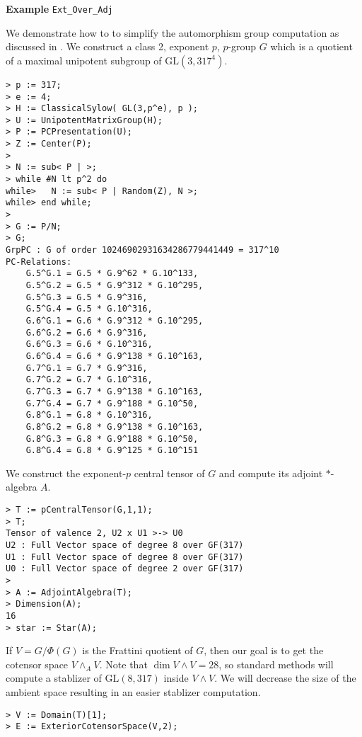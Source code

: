 \begin{framed} {\bf Example} {\tt Ext\_Over\_Adj}\\
{\small We demonstrate how to to simplify the automorphism group computation as discussed in \cite{BW:grps-tensor}.
We construct a class 2, exponent $p$, $p$-group $G$ which is a quotient of a maximal unipotent subgroup of $\text{GL}(3,317^4)$.
\begin{lstlisting}[frame=single,basicstyle=\ttfamily\color{black!30!
teal},backgroundcolor=\color{white!70!gray}]
> p := 317;
> e := 4;
> H := ClassicalSylow( GL(3,p^e), p );
> U := UnipotentMatrixGroup(H);
> P := PCPresentation(U);
> Z := Center(P);
> 
> N := sub< P | >;
> while #N lt p^2 do
while>   N := sub< P | Random(Z), N >;
while> end while;
> 
> G := P/N;
> G;
GrpPC : G of order 10246902931634286779441449 = 317^10
PC-Relations:
    G.5^G.1 = G.5 * G.9^62 * G.10^133, 
    G.5^G.2 = G.5 * G.9^312 * G.10^295, 
    G.5^G.3 = G.5 * G.9^316, 
    G.5^G.4 = G.5 * G.10^316, 
    G.6^G.1 = G.6 * G.9^312 * G.10^295, 
    G.6^G.2 = G.6 * G.9^316, 
    G.6^G.3 = G.6 * G.10^316, 
    G.6^G.4 = G.6 * G.9^138 * G.10^163, 
    G.7^G.1 = G.7 * G.9^316, 
    G.7^G.2 = G.7 * G.10^316, 
    G.7^G.3 = G.7 * G.9^138 * G.10^163, 
    G.7^G.4 = G.7 * G.9^188 * G.10^50, 
    G.8^G.1 = G.8 * G.10^316, 
    G.8^G.2 = G.8 * G.9^138 * G.10^163, 
    G.8^G.3 = G.8 * G.9^188 * G.10^50, 
    G.8^G.4 = G.8 * G.9^125 * G.10^151
\end{lstlisting}
We construct the exponent-$p$ central tensor of $G$ and compute its adjoint $*$-algebra $A$.
\begin{lstlisting}[frame=single,basicstyle=\ttfamily\color{black!30!
teal},backgroundcolor=\color{white!70!gray}]
> T := pCentralTensor(G,1,1);
> T;
Tensor of valence 2, U2 x U1 >-> U0
U2 : Full Vector space of degree 8 over GF(317)
U1 : Full Vector space of degree 8 over GF(317)
U0 : Full Vector space of degree 2 over GF(317)
> 
> A := AdjointAlgebra(T);
> Dimension(A);
16
> star := Star(A);
\end{lstlisting}
If $V=G/\Phi(G)$ is the Frattini quotient of $G$, then our goal is to get the cotensor space $V\wedge_A V$.
Note that $\dim V\wedge V=28$, so standard methods will compute a stablizer of $\text{GL}(8,317)$ inside $V\wedge V$.
We will decrease the size of the ambient space resulting in an easier stablizer computation.
\begin{lstlisting}[frame=single,basicstyle=\ttfamily\color{black!30!
teal},backgroundcolor=\color{white!70!gray}]
> V := Domain(T)[1];
> E := ExteriorCotensorSpace(V,2);

\end{lstlisting}}
\end{framed}
